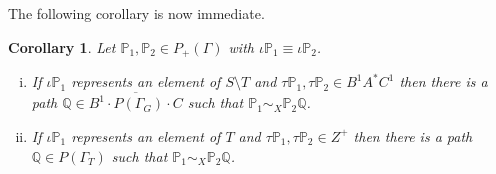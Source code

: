 \documentclass[11pt]{amsart}
\newtheorem{cor}{Corollary}
\theoremstyle{plain}
\begin{document}
The following corollary is now immediate. 

\begin{cor}\label{Corollary}
Let ${\mathbb{P}}_1, {\mathbb{P}}_2 \in P_+(\Gamma)$ with $\iota {\mathbb{P}}_1 \equiv \iota {\mathbb{P}}_2$.
\begin{enumerate}[(i)]
\item If $\iota {\mathbb{P}}_1$ represents an element of $S \setminus T$ and $\tau {\mathbb{P}}_1 , \tau {\mathbb{P}}_2  \in B^1 A^* C^1$ then there is a path ${\mathbb{Q}} \in \overline{B^1 \cdot P(\Gamma_G) \cdot C}$ such that ${\mathbb{P}}_1 \sim_X {\mathbb{P}}_2 {\mathbb{Q}}$.
\item If $\iota {\mathbb{P}}_1$ represents an element of $T$ and $\tau {\mathbb{P}}_1 , \tau {\mathbb{P}}_2  \in Z^+$ then there is a path ${\mathbb{Q}} \in P(\Gamma_T)$ such that ${\mathbb{P}}_1 \sim_X {\mathbb{P}}_2 {\mathbb{Q}}$.
\end{enumerate}
\end{cor}
\end{document}
